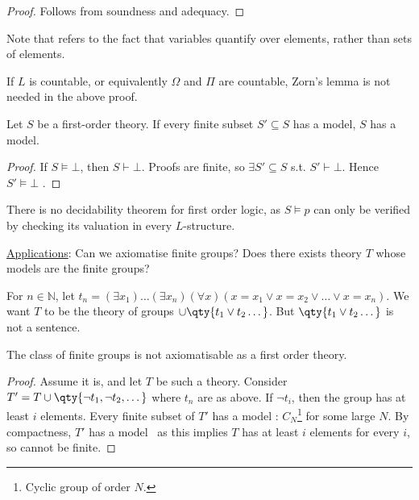 \begin{proof}
    Follows from soundness and adequacy.
\end{proof}

Note that  refers to the fact that variables quantify over elements, rather than sets of elements.

\begin{remark}
    If $L$ is countable, or equivalently $\Omega$ and $\Pi$ are countable, Zorn's lemma is not needed in the above proof.
\end{remark}

\begin{theorem}
    Let $S$ be a first-order theory.
    If every finite subset $S' \subseteq S$ has a model, $S$ has a model.
\end{theorem}

\begin{proof}
    If $S \models \bot$, then $S \vdash \bot$.
    Proofs are finite, so $\exists S' \subseteq S$ s.t. $S' \vdash \bot$.
    Hence $S' \models \bot$ \Lightning.
\end{proof}

There is no decidability theorem for first order logic, as $S \models p$ can only be verified by checking its valuation in every $L$-structure.

\underline{Applications}: Can we axiomatise finite groups?
Does there exists theory $T$ whose models are the finite groups?

For $n \in \mathbb{N}$, let $t_n = (\exists x_1) \dots (\exists x_n) (\forall x) (x = x_1 \vee x = x_2 \vee \dots \vee x = x_n)$.
We want $T$ to be the theory of groups $\cup \qty{t_1 \vee t_2 \dots}$.
But $\qty{t_1 \vee t_2 \dots}$ is not a sentence.

\begin{corollary}
    The class of finite groups is not axiomatisable as a first order theory.
\end{corollary}

\begin{proof}
    Assume it is, and let $T$ be such a theory.
    Consider $T' = T \cup \qty{\neg t_1, \neg t_2, \dots}$ where $t_n$ are as above.
    If $\neg t_i$, then the group has at least $i$ elements.
    Every finite subset of $T'$ has a model : $C_N$\footnote{Cyclic group of order $N$.} for some large $N$.
    By compactness, $T'$ has a model \Lightning \ as this implies $T$ has at least $i$ elements for every $i$, so cannot be finite.
\end{proof}

